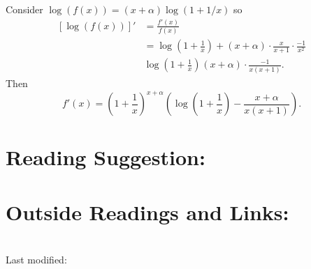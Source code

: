 \documentclass[12pt]{article}
\begin{document}
\begin{solution}
    Consider \( \log(f(x)) = (x + \alpha) \log(1 + 1/x) \) so
    \begin{align*}
        \left[ \log(f(x)) \right]' &= \frac{f'(x)}{f(x)} \\
        &= \log\left( 1 + \frac{1}{x} \right) + (x+\alpha) \cdot
        \frac{x}{x+1} \cdot \frac{-1}{x^2} \\
        & \log\left( 1 + \frac{1}{x} \right) _{} (x+\alpha) \cdot
        \frac{-1}{x(x+1)}.
    \end{align*}
    Then
    \[
        f'(x) = \left( 1 + \frac{1}{x} \right)^{x + \alpha}
        \left( \log\left( 1 + \frac{1}{x} \right) - \frac{x+\alpha}
        {x(x+1)} \right).
    \]
\end{solution}

\hr

\section*{Reading Suggestion:}




\hr

\section*{Outside Readings and Links:} %

\section*{\solutionsname}
\loadSolutions

\hr

\mydisclaim \myfooter

Last modified:  \flastmod
\end{document}
